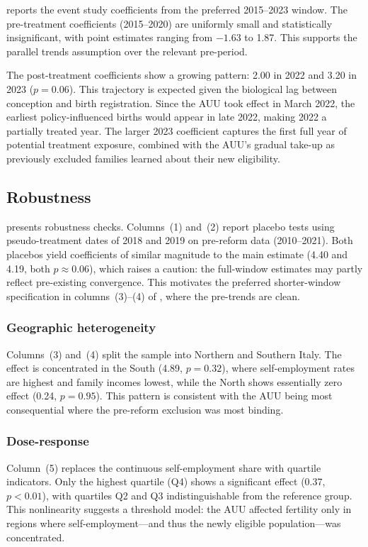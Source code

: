 \documentclass[12pt]{article}
\begin{document}
 reports the event study coefficients from the preferred 2015--2023 window. The pre-treatment coefficients (2015--2020) are uniformly small and statistically insignificant, with point estimates ranging from $-1.63$ to 1.87. This supports the parallel trends assumption over the relevant pre-period.

The post-treatment coefficients show a growing pattern: 2.00 in 2022 and 3.20 in 2023 ($p = 0.06$). This trajectory is expected given the biological lag between conception and birth registration. Since the AUU took effect in March 2022, the earliest policy-influenced births would appear in late 2022, making 2022 a partially treated year. The larger 2023 coefficient captures the first full year of potential treatment exposure, combined with the AUU's gradual take-up as previously excluded families learned about their new eligibility.



\subsection{Robustness}

 presents robustness checks. Columns~(1) and~(2) report placebo tests using pseudo-treatment dates of 2018 and 2019 on pre-reform data (2010--2021). Both placebos yield coefficients of similar magnitude to the main estimate (4.40 and 4.19, both $p \approx 0.06$), which raises a caution: the full-window estimates may partly reflect pre-existing convergence. This motivates the preferred shorter-window specification in columns~(3)--(4) of , where the pre-trends are clean.

\subsubsection*{Geographic heterogeneity} Columns~(3) and~(4) split the sample into Northern and Southern Italy. The effect is concentrated in the South (4.89, $p = 0.32$), where self-employment rates are highest and family incomes lowest, while the North shows essentially zero effect (0.24, $p = 0.95$). This pattern is consistent with the AUU being most consequential where the pre-reform exclusion was most binding.

\subsubsection*{Dose-response} Column~(5) replaces the continuous self-employment share with quartile indicators. Only the highest quartile (Q4) shows a significant effect (0.37, $p < 0.01$), with quartiles Q2 and Q3 indistinguishable from the reference group. This nonlinearity suggests a threshold model: the AUU affected fertility only in regions where self-employment---and thus the newly eligible population---was concentrated.
\end{document}
